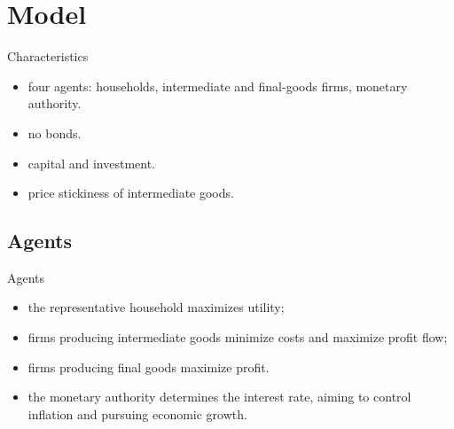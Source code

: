 \documentclass[
presentation.tex
]{subfiles}
\begin{document}
\section{Model}


\begin{frame}{Characteristics}
	
	\begin{itemize}
		
		\item four agents: households, intermediate and final-goods firms, monetary authority.
		
		\item no bonds.
		
		\item capital and investment.
		
		\item price stickiness of intermediate goods.
		
	\end{itemize}
	
\end{frame}
	

	\subsection{Agents}
	
	\begin{frame}{Agents}

	\begin{itemize}
	
	\item the representative household maximizes utility;
	
	\item firms producing intermediate goods minimize costs and maximize profit flow;
	
	\item firms producing final goods maximize profit.

	\item the monetary authority determines the interest rate, aiming to control inflation and pursuing economic growth.
	
	\end{itemize}		

	\end{frame}
\end{document}
